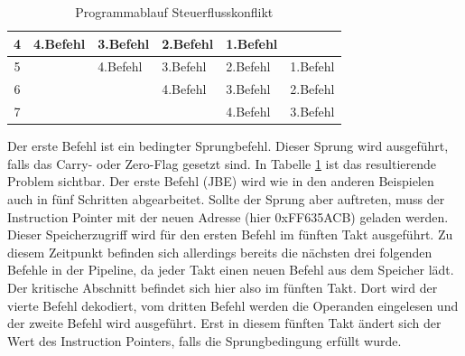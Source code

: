 \documentclass[a4paper,12pt]{article}
\begin{document}
\begin{table}[]
\begin{tabular}{|c|l|l|l|l|l|}
4             & \cellcolor[HTML]{FFFE65}4.Befehl                                                        & \cellcolor[HTML]{67FD9A}3.Befehl                                                           & \cellcolor[HTML]{38FFF8}2.Befehl                                                            & \cellcolor[HTML]{9698ED}1.Befehl        &                                                                                               \\ \hline
5             & \cellcolor[HTML]{FFFFFF}                                                                & \cellcolor[HTML]{FFFE65}4.Befehl                                                           & \cellcolor[HTML]{67FD9A}3.Befehl                                                            & \cellcolor[HTML]{38FFF8}2.Befehl        & \cellcolor[HTML]{9698ED}1.Befehl                                                              \\ \hline
6             &                                                                                         & \cellcolor[HTML]{FFFFFF}                                                                   & \cellcolor[HTML]{FFFE65}4.Befehl                                                            & \cellcolor[HTML]{67FD9A}3.Befehl        & \cellcolor[HTML]{38FFF8}2.Befehl                                                              \\ \hline
7             &                                                                                         &                                                                                            & \cellcolor[HTML]{FFFFFF}                                                                    & \cellcolor[HTML]{FFFE65}4.Befehl        & \cellcolor[HTML]{67FD9A}3.Befehl                                                              \\ \hline
\end{tabular}
\caption{Programmablauf Steuerflusskonflikt}
\label{tab:Steuerflusskonflikt}

\end{table}

\noindent Der erste Befehl ist ein bedingter Sprungbefehl. Dieser Sprung wird ausgeführt, falls das Carry- oder Zero-Flag gesetzt sind. In Tabelle \ref{tab:Steuerflusskonflikt} ist das resultierende Problem sichtbar. Der erste Befehl (JBE) wird wie in den anderen Beispielen auch in fünf Schritten abgearbeitet. Sollte der Sprung aber auftreten, muss der Instruction Pointer mit der neuen Adresse (hier 0xFF635ACB) geladen werden. Dieser Speicherzugriff wird für den ersten Befehl im fünften Takt ausgeführt. Zu diesem Zeitpunkt befinden sich allerdings bereits die nächsten drei folgenden Befehle in der Pipeline, da jeder Takt einen neuen Befehl aus dem Speicher lädt. Der kritische Abschnitt befindet sich hier also im fünften Takt. Dort wird der vierte Befehl dekodiert, vom dritten Befehl werden die Operanden eingelesen und der zweite Befehl wird ausgeführt. Erst in diesem fünften Takt ändert sich der Wert des Instruction Pointers, falls die Sprungbedingung erfüllt wurde. 
\end{document}
